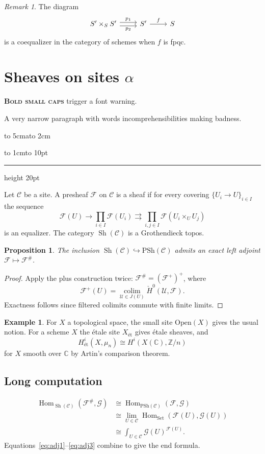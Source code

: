 \documentclass[11pt]{amsart}
\newtheorem{proposition}[theorem]{Proposition}
\theoremstyle{definition}
\newtheorem{example}[theorem]{Example}
\theoremstyle{remark}
\newtheorem{remark}[theorem]{Remark}
\newcommand{\Hom}{\operatorname{Hom}}
\newcommand{\cC}{\mathcal{C}}
\newcommand{\cF}{\mathcal{F}}
\newcommand{\Sh}{\operatorname{Sh}}
\begin{document}
\begin{remark}
The diagram
\[
\begin{tikzcd}
S'\times_S S' \arrow[r, shift left, "p_1"] \arrow[r, shift right, "p_2"'] & S' \arrow[r, "f"] & S
\end{tikzcd}
\]
is a coequalizer in the category of schemes when $f$ is fpqc.
\end{remark}

\section{Sheaves on sites $\alpha$}\label{sec:sites}
\textsc{\textbf{Bold small caps}} trigger a font warning.
\noindent\parbox{3cm}{A very narrow paragraph with words incomprehensibilities making badness.}

\hbox to 5cm{a\hfil}\hbox to 2cm{}\par
\vbox to 1cm{}\vbox to 10pt{\hrule height 20pt}
Let $\cC$ be a site. A presheaf $\cF$ on $\cC$ is a sheaf if for every
covering $\{U_i\to U\}_{i\in I}$ the sequence
\[
\cF(U)\to\prod_{i\in I}\cF(U_i)\rightrightarrows\prod_{i,j\in I}\cF(U_i\times_U U_j)
\]
is an equalizer. The category $\Sh(\cC)$ is a Grothendieck topos.

\begin{proposition}\label{prop:sheafification}
The inclusion $\Sh(\cC)\hookrightarrow\mathrm{PSh}(\cC)$ admits an exact left
adjoint $\cF\mapsto\cF^{\#}$.
\end{proposition}

\begin{proof}
Apply the plus construction twice: $\cF^{\#}=(\cF^+)^+$, where
\[
\cF^+(U)=\operatorname*{colim}_{\mathcal{U}\in J(U)}\check{H}^0(\mathcal{U},\cF).
\]
Exactness follows since filtered colimits commute with finite limits.
\end{proof}

\begin{example}
For $X$ a topological space, the small site $\mathrm{Open}(X)$ gives the
usual notion. For a scheme $X$ the étale site $X_{\text{ét}}$ gives
étale sheaves, and
\[
H^i_{\text{ét}}(X,\mu_n)\cong H^i(X(\mathbb{C}),\mathbb{Z}/n)
\]
for $X$ smooth over $\mathbb{C}$ by Artin's comparison theorem.
\end{example}

\subsection{Long computation}
\begin{align}
\Hom_{\Sh(\cC)}(\cF^{\#},\mathcal{G})
&\cong \Hom_{\mathrm{PSh}(\cC)}(\cF,\mathcal{G}) \label{eq:adj1}\\
&\cong \lim_{U\in\cC}\Hom_{\mathrm{Set}}(\cF(U),\mathcal{G}(U)) \label{eq:adj2}\\
&\cong \int_{U\in\cC}\mathcal{G}(U)^{\cF(U)}. \label{eq:adj3}
\end{align}
Equations~\eqref{eq:adj1}--\eqref{eq:adj3} combine to give the end formula.
\end{document}
